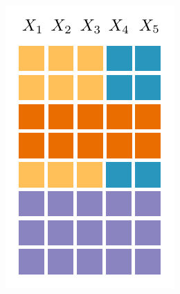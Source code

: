 \documentclass[final]{beamer}
\begin{document}
\begin{frame}{}
\begin{textblock}{25.7}
{\begin{minipage}[t]{6.3cm}
    \end{minipage}}\begin{minipage}[t]{5.54cm}
      \includegraphics[width=\linewidth]{figures/grid-2}
    \end{minipage}\raisebox{42pt}{\begin{minipage}[t]{7.2cm}

\end{minipage}}
\end{textblock}
\end{frame}
\end{document}
